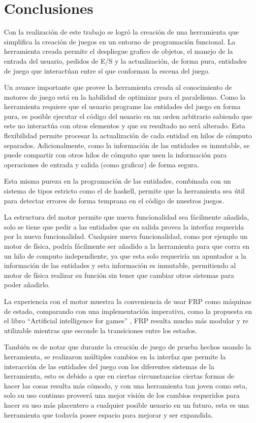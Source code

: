 
\chapter{Conclusiones}
\label{capitulo6}

Con la realización de este trabajo se logró la creación de una herramienta que simplifica la creación de juegos en un entorno de programación funcional. La herramienta creada permite el despliegue grafico de objetos, el manejo de la entrada del usuario, pedidos de E/S y la actualización, de forma pura, entidades de juego que interactúan entre sí que conforman la escena del juego.

Un avance importante que provee la herramienta creada al conocimiento de motores de juego está en la habilidad de optimizar para el paralelismo. Como la herramienta requiere que el usuario programe las entidades del juego en forma pura, es posible ejecutar el código del usuario en un orden arbitrario sabiendo que este no interactúa con otros elementos y que su resultado no será alterado. Esta flexibilidad permite procesar la actualización de cada entidad en hilos de cómputo separados. Adicionalmente, como la información de las entidades es inmutable, se puede compartir con otros hilos de cómputo que usen la información para operaciones de entrada y salida (como graficar) de forma segura.

Esta misma pureza en la programación de las entidades, combinada con un sistema de tipos estricto como el de haskell, permite que la herramienta sea útil para detectar errores de forma temprana en el código de nuestros juegos.

La estructura del motor permite que nueva funcionalidad  sea fácilmente añadida, solo se tiene que pedir a las entidades que su salida provea la interfaz requerida por la nueva funcionalidad. Cualquier nueva funcionalidad, como por ejemplo un motor de física, podría fácilmente ser añadido a la herramienta para que corra en un hilo de computo independiente, ya que esta solo requeriría un apuntador a la información de las entidades y esta información es inmutable, permitiendo al motor de física realizar su función sin tener que cambiar otros sistemas para poder añadirlo.

La experiencia con el motor muestra la conveniencia de usar FRP como máquinas de estado, comparando con una implementación imperativa, como la propuesta en el libro “Artificial intelligence for games” \cite{millington2016artificial}, FRP resulta mucho más modular y re utilizable mientras que esconde la transiciones entre los estados.

También es de notar que durante la creación de juego de prueba hechos usando la herramienta, se realizaron múltiples cambios en la interfaz que permite la interacción de las entidades del juego con los diferentes sistemas de la herramienta, esto es debido a que en ciertas circunstancias ciertas formas de hacer las cosas resulta más cómodo, y con una herramienta tan joven como esta, solo su uso continuo proveerá una mejor visión de los cambios requeridos para hacer su uso más placentero a cualquier posible usuario en un futuro, esta es una herramienta que todavía posee espacio para mejorar y ser expandida.

